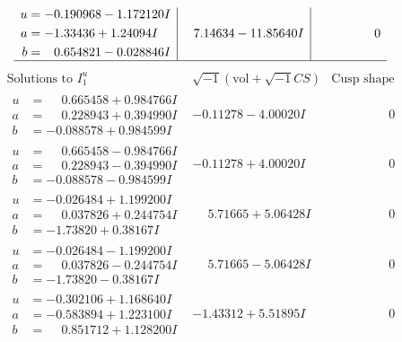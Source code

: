 \documentclass[1p]{elsarticle_modified}
\theoremstyle{definition}
\newcommand{\I}{\sqrt{-1}}
\begin{document}
$$\begin{array}{c|c|c}
\begin{aligned}
u &= -0.190968 - 1.172120 I \\
a &= -1.33436 + 1.24094 I \\
b &= \phantom{-}0.654821 - 0.028846 I\end{aligned}
 & \phantom{-}7.14634 - 11.85640 I & \phantom{-0.000000 } 0\\
 \hline 
 \end{array}$$\newpage$$\begin{array}{c|c|c}  
\text{Solutions to }I^u_{1}& \I (\text{vol} + \sqrt{-1}CS) & \text{Cusp shape}\\
 \hline 
\begin{aligned}
u &= \phantom{-}0.665458 + 0.984766 I \\
a &= \phantom{-}0.228943 + 0.394990 I \\
b &= -0.088578 + 0.984599 I\end{aligned}
 & -0.11278 - 4.00020 I & \phantom{-0.000000 } 0 \\ \hline\begin{aligned}
u &= \phantom{-}0.665458 - 0.984766 I \\
a &= \phantom{-}0.228943 - 0.394990 I \\
b &= -0.088578 - 0.984599 I\end{aligned}
 & -0.11278 + 4.00020 I & \phantom{-0.000000 } 0 \\ \hline\begin{aligned}
u &= -0.026484 + 1.199200 I \\
a &= \phantom{-}0.037826 + 0.244754 I \\
b &= -1.73820 + 0.38167 I\end{aligned}
 & \phantom{-}5.71665 + 5.06428 I & \phantom{-0.000000 } 0 \\ \hline\begin{aligned}
u &= -0.026484 - 1.199200 I \\
a &= \phantom{-}0.037826 - 0.244754 I \\
b &= -1.73820 - 0.38167 I\end{aligned}
 & \phantom{-}5.71665 - 5.06428 I & \phantom{-0.000000 } 0 \\ \hline\begin{aligned}
u &= -0.302106 + 1.168640 I \\
a &= -0.583894 + 1.223100 I \\
b &= \phantom{-}0.851712 + 1.128200 I\end{aligned}
 & -1.43312 + 5.51895 I & \phantom{-0.000000 } 0 \\ \hline\begin{aligned}

\end{aligned}
\end{array}$$
\end{document}
